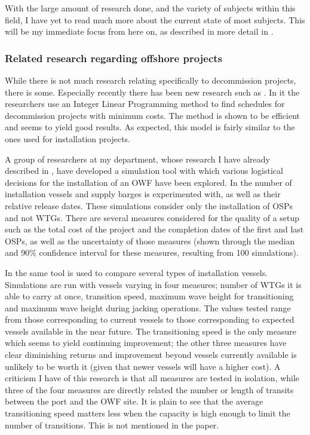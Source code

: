 \documentclass[a4paper,12pt]{article}
\begin{document}
With the large amount of research done, and the variety of subjects within this field, I have yet to read much more about the current state of most subjects. This will be my immediate focus from here on, as described in more detail in .

\subsubsection{Related research regarding offshore projects} \label{sss:offsh}
While there is not much research relating specifically to decommission projects, there is some. Especially recently there has been new research such as \cite{irawan2019optimisation}. In it the researchers use an Integer Linear Programming method to find schedules for decommission projects with minimum costs. The method is shown to be efficient and seems to yield good results. As expected, this model is fairly similar to the ones used for installation projects. 

\bigskip

A group of researchers at my department, whose research \cite{barlow2018mixed} I have already described in , have developed a simulation tool with which various logistical decisions for the installation of an OWF have been explored. In \cite{barlow2014support} the number of installation vessels and supply barges is experimented with, as well as their relative release dates. These simulations consider only the installation of OSPs and not WTGs. There are several measures considered for the quality of a setup such as the total cost of the project and the completion dates of the first and last OSPs, as well as the uncertainty of those measures (shown through the median and 90\% confidence interval for these measures, resulting from 100 simulations). 

In \cite{barlow2014assessment} the same tool is used to compare several types of installation vessels. Simulations are run with vessels varying in four measures; number of WTGs it is able to carry at once, transition speed, maximum wave height for transitioning and maximum wave height during jacking operations. The values tested range from those corresponding to current vessels to those corresponding to expected vessels available in the near future. The transitioning speed is the only measure which seems to yield continuing improvement; the other three measures have clear diminishing returns and improvement beyond vessels currently available is unlikely to be worth it (given that newer vessels will have a higher cost). A criticism I have of this research is that all measures are tested in isolation, while three of the four measures are directly related the number or length of transits between the port and the OWF site. It is plain to see that the average transitioning speed matters less when the capacity is high enough to limit the number of transitions. This is not mentioned in the paper.
\end{document}
